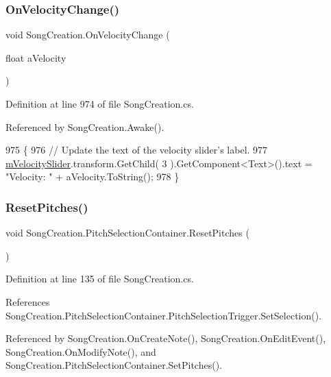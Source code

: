 \subsubsection{\texorpdfstring{On\+Velocity\+Change()}{OnVelocityChange()}}
{\footnotesize\ttfamily void Song\+Creation.\+On\+Velocity\+Change (\begin{DoxyParamCaption}\item[{float}]{a\+Velocity }\end{DoxyParamCaption})}



Definition at line 974 of file Song\+Creation.\+cs.



Referenced by Song\+Creation.\+Awake().


\begin{DoxyCode}
975     \{
976         \textcolor{comment}{// Update the text of the velocity slider's label.}
977         \hyperlink{group___s_c_priv_var_ga0738678367556ebb69df6e73213f616d}{mVelocitySlider}.transform.GetChild( 3 ).GetComponent<Text>().text = \textcolor{stringliteral}{"Velocity: "} + 
      aVelocity.ToString();
978     \}
\end{DoxyCode}
\mbox{\label{group___s_c_handlers_ga9dc0b40102f1fb0e50fdf07ca7b31d96}} 
\subsubsection{\texorpdfstring{Reset\+Pitches()}{ResetPitches()}}
{\footnotesize\ttfamily void Song\+Creation.\+Pitch\+Selection\+Container.\+Reset\+Pitches (\begin{DoxyParamCaption}{ }\end{DoxyParamCaption})}



Definition at line 135 of file Song\+Creation.\+cs.



References Song\+Creation.\+Pitch\+Selection\+Container.\+Pitch\+Selection\+Trigger.\+Set\+Selection().



Referenced by Song\+Creation.\+On\+Create\+Note(), Song\+Creation.\+On\+Edit\+Event(), Song\+Creation.\+On\+Modify\+Note(), and Song\+Creation.\+Pitch\+Selection\+Container.\+Set\+Pitches().


